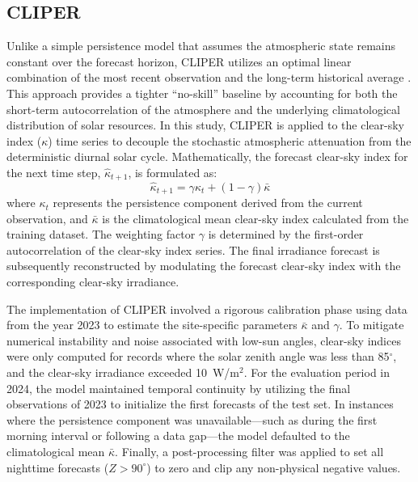 \documentclass[number, 3p, 10pt, times]{elsarticle}
\begin{document}
\subsection{CLIPER}
Unlike a simple persistence model that assumes the atmospheric state remains constant over the forecast horizon, CLIPER utilizes an optimal linear combination of the most recent observation and the long-term historical average \citep{YANG2019981}. This approach provides a tighter ``no-skill'' baseline by accounting for both the short-term autocorrelation of the atmosphere and the underlying climatological distribution of solar resources. In this study, CLIPER is applied to the clear-sky index ($\kappa$) time series to decouple the stochastic atmospheric attenuation from the deterministic diurnal solar cycle. Mathematically, the forecast clear-sky index for the next time step, $\hat{\kappa}_{t+1}$, is formulated as:
\begin{equation}
    \hat{\kappa}_{t+1} = \gamma \kappa_{t} + (1 - \gamma) \bar{\kappa}
\end{equation}
where $\kappa_{t}$ represents the persistence component derived from the current observation, and $\bar{\kappa}$ is the climatological mean clear-sky index calculated from the training dataset. The weighting factor $\gamma$ is determined by the first-order autocorrelation of the clear-sky index series. The final irradiance forecast is subsequently reconstructed by modulating the forecast clear-sky index with the corresponding clear-sky irradiance. 

The implementation of CLIPER involved a rigorous calibration phase using data from the year 2023 to estimate the site-specific parameters $\bar{\kappa}$ and $\gamma$. To mitigate numerical instability and noise associated with low-sun angles, clear-sky indices were only computed for records where the solar zenith angle was less than 85$^\circ$, and the clear-sky irradiance exceeded 10~W/m$^2$. For the evaluation period in 2024, the model maintained temporal continuity by utilizing the final observations of 2023 to initialize the first forecasts of the test set. In instances where the persistence component was unavailable---such as during the first morning interval or following a data gap---the model defaulted to the climatological mean $\bar{\kappa}$. Finally, a post-processing filter was applied to set all nighttime forecasts ($Z> 90^\circ$) to zero and clip any non-physical negative values.
\end{document}
